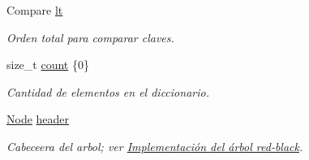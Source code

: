 \begin{Indent}
{
}\begin{DoxyCompactItemize}
\item 
Compare \hyperlink{classaed2_1_1map_a0e5be36fae0693e4665bd2a615e7550a_a0e5be36fae0693e4665bd2a615e7550a}{lt}
\begin{DoxyCompactList}\small\item\em Orden total para comparar claves. \end{DoxyCompactList}\item 
size\+\_\+t \hyperlink{classaed2_1_1map_a44236c4f16cdc20a10759862b198bde4_a44236c4f16cdc20a10759862b198bde4}{count} \{0\}
\begin{DoxyCompactList}\small\item\em Cantidad de elementos en el diccionario. \end{DoxyCompactList}\item 
\hyperlink{structaed2_1_1map_1_1Node}{Node} \hyperlink{classaed2_1_1map_a92d93f905c8ad73fba18fdc7e8915cce_a92d93f905c8ad73fba18fdc7e8915cce}{header}
\begin{DoxyCompactList}\small\item\em Cabeceera del arbol; ver \hyperlink{Implementacion}{Implementación del árbol red-\/black}. \end{DoxyCompactList}\end{DoxyCompactItemize}
\end{Indent}
